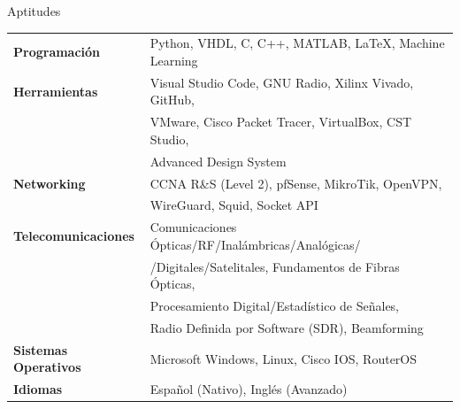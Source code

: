 \documentclass{resume} %
\begin{document}

\begin{rSection}{Aptitudes}

    \begin{tabular}{ @{} >{\bfseries}l @{\hspace{6ex}} l }
        Programación        & Python, VHDL, C, C++, MATLAB, \LaTeX, Machine Learning \\
        Herramientas        & Visual Studio Code, GNU Radio, Xilinx Vivado, GitHub,  \\ & VMware, Cisco Packet Tracer, VirtualBox, CST Studio, \\
                            & Advanced Design System                                 \\
        Networking          & CCNA R\&S (Level 2), pfSense, MikroTik, OpenVPN,       \\ & WireGuard, Squid, Socket API                                            \\
        Telecomunicaciones  & Comunicaciones Ópticas/RF/Inalámbricas/Analógicas/     \\ & /Digitales/Satelitales, Fundamentos de Fibras Ópticas, \\ & Procesamiento Digital/Estadístico de Señales, \\
                            & Radio Definida por Software (SDR), Beamforming         \\
        Sistemas Operativos & Microsoft Windows, Linux, Cisco IOS, RouterOS          \\
        Idiomas             & Español (Nativo), Inglés (Avanzado)
    \end{tabular}

\end{rSection}
\end{document}
